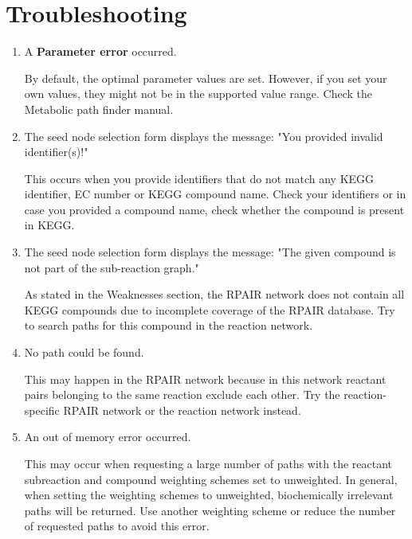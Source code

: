 \section{Troubleshooting}

\begin{enumerate}

\item A \textbf{Parameter error} occurred.

	By default, the optimal parameter values are set. However, if you set your own values, they might not
	be in the supported value range. Check the Metabolic path finder manual.

\item The seed node selection form displays the message: "You provided invalid identifier(s)!"

     This occurs when you provide identifiers that do not match any KEGG identifier, EC number or KEGG
     compound name. Check your identifiers or in case you provided a compound name, check whether the
     compound is present in KEGG.

\item The seed node selection form displays the message: "The given compound is not part of the sub-reaction graph."

     As stated in the Weaknesses section, the RPAIR network does not contain all KEGG compounds due to incomplete
     coverage of the RPAIR database. Try to search paths for this compound in the reaction network.

\item No path could be found.

	This may happen in the RPAIR network because in this network reactant pairs belonging to the same reaction
	exclude each other. Try the reaction-specific RPAIR network or the reaction network instead.

\item An out of memory error occurred.

 	This may occur when requesting a large number of paths with the reactant subreaction and compound weighting schemes
 	set to unweighted. In general, when setting the weighting schemes to unweighted, biochemically irrelevant paths
 	will be returned. Use another weighting scheme or reduce the number of requested paths to avoid this error.

\end{enumerate}







